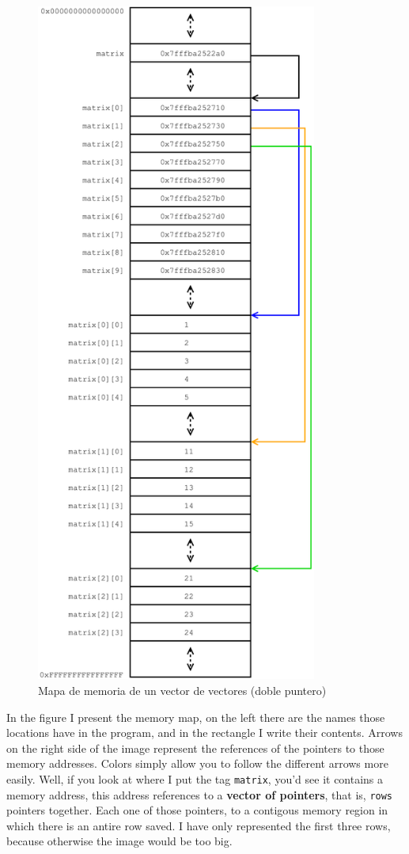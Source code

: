 \documentclass[a4paper]{article}
\begin{document}
\begin{figure}[H]
    \center
    \includegraphics[height=225mm]{double_pointer_map}
    \caption{Mapa de memoria de un vector de vectores (doble puntero)}
    \label{img:double_pointer_map}
\end{figure}

In the figure I present the memory map, on the left there are the names those
locations have in the program, and in the rectangle I write their contents.
Arrows on the right side of the image represent the references of the pointers
to those memory addresses. Colors simply allow you to follow the different
arrows more easily. Well, if you look at where I put the tag \verb!matrix!,
you'd see it contains a memory address, this address references to a
\textbf{vector of pointers}, that is, \verb!rows! pointers together. Each one of
those pointers, to a contigous memory region in which there is an antire row
saved. I have only represented the first three rows, because otherwise the image
would be too big.
\end{document}
